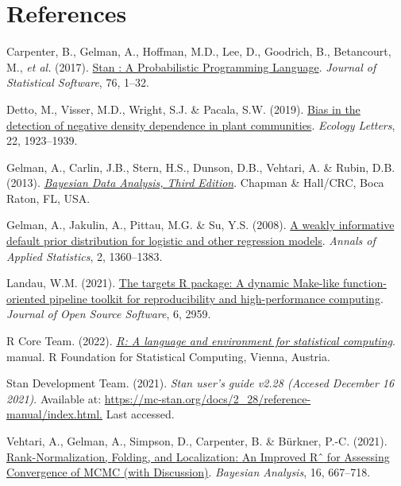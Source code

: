 \documentclass[
  12pt,
  letterpaper,
  DIV=11,
  numbers=noendperiod]{scrartcl}
\newlength{\cslhangindent}
\newlength{\cslentryspacingunit} %
\newenvironment{CSLReferences}[2] %
 {%
  \setlength{\parindent}{0pt}
  \ifodd #1
  \let\oldpar\par
  \def\par{\hangindent=\cslhangindent\oldpar}
  \fi
  \setlength{\parskip}{#2\cslentryspacingunit}
 }%
 {}
\begin{document}
\hypertarget{references}{%
\section{References}\label{references}}

\hypertarget{refs}{}
\begin{CSLReferences}{1}{0}
\leavevmode{}%
Carpenter, B., Gelman, A., Hoffman, M.D., Lee, D., Goodrich, B.,
Betancourt, M., \emph{et al.} (2017).
\href{https://doi.org/10.18637/jss.v076.i01}{Stan : {A Probabilistic
Programming Language}}. \emph{Journal of Statistical Software}, 76,
1--32.

\leavevmode{}%
Detto, M., Visser, M.D., Wright, S.J. \& Pacala, S.W. (2019).
\href{https://doi.org/10.1111/ele.13372}{Bias in the detection of
negative density dependence in plant communities}. \emph{Ecology
Letters}, 22, 1923--1939.

\leavevmode{}%
Gelman, A., Carlin, J.B., Stern, H.S., Dunson, D.B., Vehtari, A. \&
Rubin, D.B. (2013).
\emph{\href{https://books.google.com.pa/books?id=eSHSBQAAQBAJ}{Bayesian
{Data Analysis}, {Third Edition}}}. {Chapman \& Hall/CRC}, {Boca Raton,
FL, USA.}

\leavevmode{}%
Gelman, A., Jakulin, A., Pittau, M.G. \& Su, Y.S. (2008).
\href{https://doi.org/10.1214/08-AOAS191}{A weakly informative default
prior distribution for logistic and other regression models}.
\emph{Annals of Applied Statistics}, 2, 1360--1383.

\leavevmode{}%
Landau, W.M. (2021). \href{https://doi.org/10.21105/joss.02959}{The
targets {R} package: A dynamic {Make-like} function-oriented pipeline
toolkit for reproducibility and high-performance computing}.
\emph{Journal of Open Source Software}, 6, 2959.

\leavevmode{}%
R Core Team. (2022). \emph{\href{https://www.R-project.org/}{R: {A}
language and environment for statistical computing}}. manual. {R
Foundation for Statistical Computing}, {Vienna, Austria}.

\leavevmode{}%
Stan Development Team. (2021). \emph{Stan user's guide v2.28 ({Accesed
December} 16 2021)}. Available at:
\href{https://mc-stan.org/docs/2_28/reference-manual/index.html}{https://mc-stan.org/docs/2\_28/reference-manual/index.html.}
Last accessed.

\leavevmode{}%
Vehtari, A., Gelman, A., Simpson, D., Carpenter, B. \& Bürkner, P.-C.
(2021). \href{https://doi.org/10.1214/20-BA1221}{Rank-{Normalization},
{Folding}, and {Localization}: {An Improved Rˆ} for {Assessing
Convergence} of {MCMC} (with {Discussion})}. \emph{Bayesian Analysis},
16, 667--718.

\end{CSLReferences}
\end{document}
